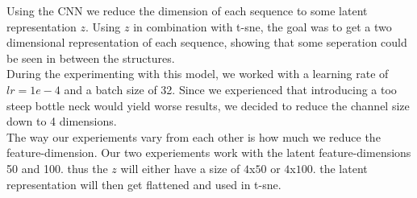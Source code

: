 Using the CNN we reduce the dimension of each sequence to some latent representation $z$. Using $z$ in combination with t-sne, the goal was to get a two dimensional representation of each sequence, showing that some seperation could be seen in between the structures. \\

\noindent
During the experimenting with this model, we worked with a learning rate of $lr=1e-4$ and a batch size of 32. Since we experienced that introducing a too steep bottle neck would yield worse results, we decided to reduce the channel size down to 4 dimensions. \\

\noindent
The way our experiements vary from each other is how much we reduce the feature-dimension. Our two experiements work with the latent feature-dimensions 50 and 100. thus the $z$ will either have a size of $4$x$50$ or $4$x$100$. the latent representation will then get flattened and used in t-sne. \\
